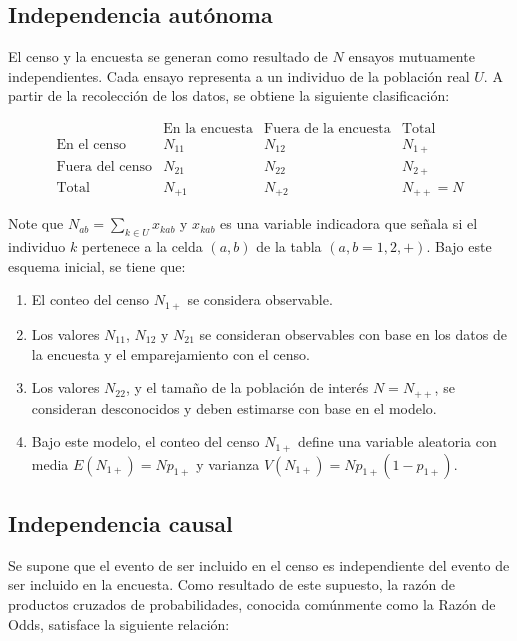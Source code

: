 \documentclass[
  12pt,
]{book}
\providecommand{\tightlist}{%
  \setlength{\itemsep}{0pt}\setlength{\parskip}{0pt}}
\begin{document}
\subsection{Independencia autónoma}\label{independencia-autuxf3noma}

El censo y la encuesta se generan como resultado de \(N\) ensayos mutuamente independientes. Cada ensayo representa a un individuo de la población real \(U\). A partir de la recolección de los datos, se obtiene la siguiente clasificación:

\[
    \begin{array}{c|cc|c}
    & \text{En la encuesta} & \text{Fuera de la encuesta} & \text{Total} \\
    \hline
    \text{En el censo} & N_{11} & N_{12} & N_{1+} \\
    \text{Fuera del censo} & N_{21} & N_{22} & N_{2+} \\
    \hline
    \text{Total} & N_{+1} & N_{+2} & N_{++} = N
    \end{array}
    \]

Note que \(N_{ab} = \sum_{k \in U} x_{kab}\) y \(x_{kab}\) es una variable indicadora que señala si el individuo \(k\) pertenece a la celda \((a, b)\) de la tabla \((a, b = 1,2,+)\). Bajo este esquema inicial, se tiene que:

\begin{enumerate}
\def\labelenumi{\arabic{enumi}.}
\tightlist
\item
  El conteo del censo \(N_{1+}\) se considera observable.
\item
  Los valores \(N_{11}\), \(N_{12}\) y \(N_{21}\) se consideran observables con base en los datos de la encuesta y el emparejamiento con el censo.
\item
  Los valores \(N_{22}\), y el tamaño de la población de interés \(N = N_{++}\), se consideran desconocidos y deben estimarse con base en el modelo.
\item
  Bajo este modelo, el conteo del censo \(N_{1+}\) define una variable aleatoria con media \(E(N_{1+}) = Np_{1+}\) y varianza \(V(N_{1+}) = Np_{1+}(1 - p_{1+})\).
\end{enumerate}

\subsection{Independencia causal}\label{independencia-causal}

Se supone que el evento de ser incluido en el censo es independiente del evento de ser incluido en la encuesta. Como resultado de este supuesto, la razón de productos cruzados de probabilidades, conocida comúnmente como la Razón de Odds, satisface la siguiente relación:
\end{document}

